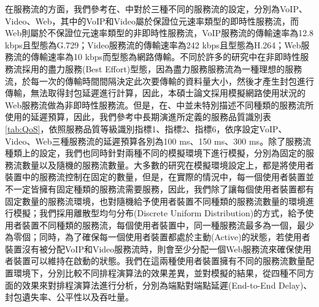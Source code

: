 在服務流的方面，我們參考在\cite{ltesim2011}、\cite{ahme2016}中對於三種不同的服務流的設定，分別為VoIP、Video、Web，其中的VoIP和Video屬於保證位元速率類型的即時性服務流，而Web則屬於不保證位元速率類型的非即時性服務流，VoIP服務流的傳輸速率為12.8 kbps且型態為G.729；Video服務流的傳輸速率為242 kbps且型態為H.264；Web服務流的傳輸速率為10 kbps而型態為網路傳輸。不同於許多的研究中在非即時性服務流採用的盡力服務(Best Effort)型態，因為盡力服務服務流為一種理想的服務流，於每一次的傳輸時間間隔決定此次要傳輸的資料量大小，然後才產生封包進行傳輸，無法取得封包延遲進行計算，因此，本碩士論文採用模擬網路使用狀況的Web服務流做為非即時性服務流。但是，在\cite{ltesim2011}、\cite{ahme2016}中並未特別描述不同種類的服務流所使用的延遲預算，因此，我們參考\cite{QCI_spec}中長期演進所定義的服務品質識別表 \ref{tab:QoS}，依照服務品質等級識別指標1、指標2、指標6，依序設定VoIP、Video、Web三種服務流的延遲預算各別為100 ms、150 ms、300 ms。除了服務流種類上的設定，我們也同時針對兩種不同的模擬環境下進行模擬，分別為固定的服務流數量以及隨機的服務流數量。大多數的研究在模擬環境設定上，都是將使用者裝置中的服務流控制在固定的數量，但是，在實際的情況中，每一個使用者裝置並不一定皆擁有固定種類的服務流需要服務，因此，我們除了讓每個使用者裝置都有固定數量的服務流環境，也對隨機給予使用者裝置不同種類的服務流數量的環境進行模擬；我們採用離散型均勻分布(Discrete Uniform Distribution)的方式，給予使用者裝置不同種類的服務流，每個使用者裝置中，同一種服務流最多為一個，最少為零個；同時，為了確保每一個使用者裝置都處於主動(Active)的狀態，若使用者裝置沒有被分配VoIP和Video服務流時，則會至少分配一個Web服務流來確保使用者裝置可以維持在啟動的狀態。我們在這兩種使用者裝置擁有不同的服務流數量配置環境下，分別比較不同排程演算法的效果差異，並對模擬的結果，從四種不同方面的效果來對排程演算法進行分析，分別為端點對端點延遲(End-to-End Delay)、封包遺失率、公平性以及吞吐量。

